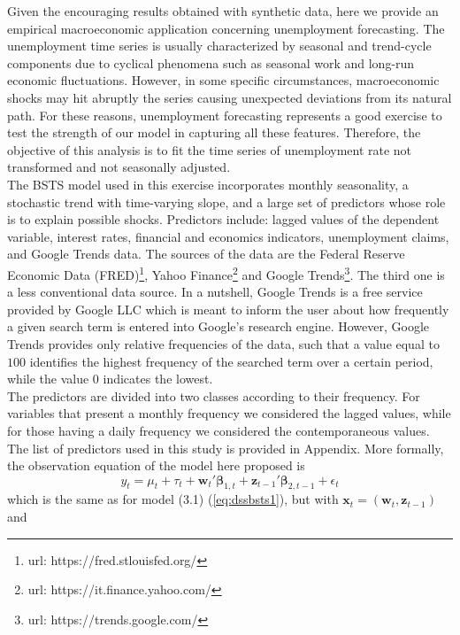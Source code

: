 \documentclass[
  12pt,
]{book}
\theoremstyle{break}
\theoremstyle{nonumberplain}
\begin{document}
Given the encouraging results obtained with synthetic data, here we
provide an empirical macroeconomic application concerning unemployment
forecasting. The unemployment time series is usually characterized by
seasonal and trend-cycle components due to cyclical phenomena such as
seasonal work and long-run economic fluctuations. However, in some
specific circumstances, macroeconomic shocks may hit abruptly the series
causing unexpected deviations from its natural path. For these reasons,
unemployment forecasting represents a good exercise to test the strength
of our model in capturing all these features. Therefore, the objective
of this analysis is to fit the time series of unemployment rate not
transformed and not seasonally adjusted.\\
The BSTS model used in this exercise incorporates monthly seasonality, a
stochastic trend with time-varying slope, and a large set of predictors
whose role is to explain possible shocks. Predictors include: lagged
values of the dependent variable, interest rates, financial and
economics indicators, unemployment claims, and Google Trends data. The
sources of the data are the Federal Reserve Economic Data
(FRED)\footnote{url: https://fred.stlouisfed.org/}, Yahoo
Finance\footnote{url: https://it.finance.yahoo.com/} and Google
Trends\footnote{url: https://trends.google.com/}. The third one is a
less conventional data source. In a nutshell, Google Trends is a free
service provided by Google LLC which is meant to inform the user about
how frequently a given search term is entered into Google's research
engine. However, Google Trends provides only relative frequencies of the
data, such that a value equal to \(100\) identifies the highest
frequency of the searched term over a certain period, while the value
\(0\) indicates the lowest.\\
The predictors are divided into two classes according to their
frequency. For variables that present a monthly frequency we considered
the lagged values, while for those having a daily frequency we
considered the contemporaneous values. The list of predictors used in
this study is provided in Appendix. More formally, the observation
equation of the model here proposed is \begin{equation}
y_{t}=\mu_{t}+\tau_{t}+\boldsymbol{w}_{t}'\boldsymbol{\beta}_{1,t}+\boldsymbol{z}_{t-1}'\boldsymbol{\beta}_{2,t-1}+\epsilon_{t}
\end{equation} which is the same as for model (3.1) (\ref{eq:dssbsts1}),
but with
\(\boldsymbol{x}_{t}=(\boldsymbol{w}_{t},\boldsymbol{z}_{t-1})\) and
\end{document}
